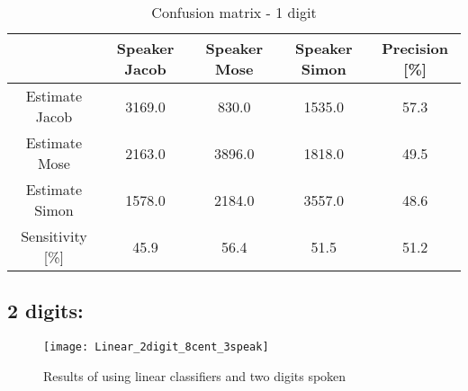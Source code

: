 \begin{table}[H]                                                    
\centering                                                          
\begin{tabular}{|c|c|c|c|c|}                                        
\hline                                                              
  & Speaker Jacob & Speaker Mose & Speaker Simon & Precision [\%] \\
\hline                                                              
Estimate Jacob & 3169.0 & 830.0 & 1535.0 & 57.3 \\                  
\hline                                                              
Estimate Mose & 2163.0 & 3896.0 & 1818.0 & 49.5 \\                  
\hline                                                              
Estimate Simon & 1578.0 & 2184.0 & 3557.0 & 48.6 \\                 
\hline                                                              
Sensitivity [\%] & 45.9 & 56.4 & 51.5 & 51.2 \\                     
\hline                                                              
\end{tabular}                                                       
\caption{Confusion matrix - 1 digit}                                
\label{table:Lin_conf_1}                                            
\end{table}     
                   

\subsection{2 digits:}

\begin{figure}[H]
\centering
\texttt{[image: Linear\_2digit\_8cent\_3speak]}
\caption{Results of using linear classifiers and two digits spoken}
\label{fig:Lin_fig_2}
\end{figure}

